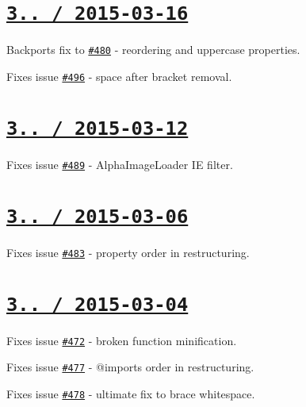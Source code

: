 \section*{\href{https://github.com/jakubpawlowicz/clean-css/compare/v3.1.6...v3.1.7}{\tt 3.. / 2015-\/03-\/16} }


\begin{DoxyItemize}
\item Backports fix to \href{https://github.com/jakubpawlowicz/clean-css/issues/480}{\tt \#480} -\/ reordering and uppercase properties.
\item Fixes issue \href{https://github.com/jakubpawlowicz/clean-css/issues/496}{\tt \#496} -\/ space after bracket removal.
\end{DoxyItemize}

\section*{\href{https://github.com/jakubpawlowicz/clean-css/compare/v3.1.5...v3.1.6}{\tt 3.. / 2015-\/03-\/12} }


\begin{DoxyItemize}
\item Fixes issue \href{https://github.com/jakubpawlowicz/clean-css/issues/489}{\tt \#489} -\/ {\ttfamily Alpha\+Image\+Loader} IE filter.
\end{DoxyItemize}

\section*{\href{https://github.com/jakubpawlowicz/clean-css/compare/v3.1.4...v3.1.5}{\tt 3.. / 2015-\/03-\/06} }


\begin{DoxyItemize}
\item Fixes issue \href{https://github.com/jakubpawlowicz/clean-css/issues/483}{\tt \#483} -\/ property order in restructuring.
\end{DoxyItemize}

\section*{\href{https://github.com/jakubpawlowicz/clean-css/compare/v3.1.3...v3.1.4}{\tt 3.. / 2015-\/03-\/04} }


\begin{DoxyItemize}
\item Fixes issue \href{https://github.com/jakubpawlowicz/clean-css/issues/472}{\tt \#472} -\/ broken function minification.
\item Fixes issue \href{https://github.com/jakubpawlowicz/clean-css/issues/477}{\tt \#477} -\/ {\ttfamily @import}s order in restructuring.
\item Fixes issue \href{https://github.com/jakubpawlowicz/clean-css/issues/478}{\tt \#478} -\/ ultimate fix to brace whitespace.
\end{DoxyItemize}

